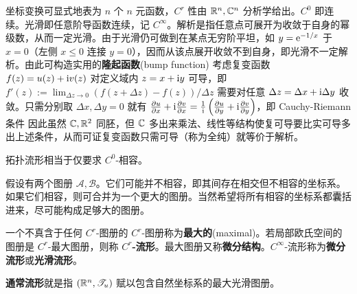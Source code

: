 \begin{remark}
    坐标变换可显式地表为 $n$ 个 $n$ 元函数，$C^r$ 性由 $\mathbb{R}^n,\mathbb{C}^n$ 分析学给出。$C^0$ 即连续。光滑即任意阶导函数连续，记 $C^\infty$。解析是指任意点可展开为收敛于自身的幂级数，从而一定光滑。由于光滑仍可做到在某点无穷阶平坦，如 $y=\mathrm{e}^{-1/x}$ 于 $x=0$（左侧 $x\leqslant 0$ 连接 $y=0$），因而从该点展开收敛不到自身，即光滑不一定解析。由此可构造实用的\textbf{隆起函数}(bump function)
    考虑复变函数 $f(z)=u(z)+\mathrm{i} v(z)$ 对定义域内 $z=x+\mathrm{i} y$ 可导，即 $f'(z):=\lim_{\Delta z\to 0}(f(z+\Delta z)-f(z))/\Delta z$ 需要对任意 $\Delta z=\Delta x+\mathrm{i}\Delta y$ 收敛。只需分别取 $\Delta x,\Delta y=0$ 就有 $\pdv{u}{x}+\mathrm{i}\pdv{v}{x}=\frac{1}{\mathrm{i}}\left(\pdv{u}{y}+\mathrm{i}\pdv{v}{y}\right)$，即 Cauchy-Riemann 条件
    因此虽然 $\mathbb{C},\mathbb{R}^2$ 同胚，但 $\mathbb{C}$ 多出来乘法、线性等结构使复可导要比实可导多出上述条件，从而可证复变函数只需可导（称为全纯）就等价于解析。
\end{remark}

\begin{example}
    拓扑流形相当于仅要求 $C^0$-相容。
\end{example}

假设有两个图册 $\mathcal A,\mathcal B$。它们可能并不相容，即其间存在相交但不相容的坐标系。如果它们相容，则可合并为一个更大的图册。当然希望将所有相容的坐标系都囊括进来，尽可能构成足够大的图册。

\begin{definition}
    一个不真含于任何 $C^r$-图册的 $C^r$-图册称为\textbf{最大的}(maximal)。若局部欧氏空间的图册是 $C^r$-最大图册，则称 \textbf{$C^r$-流形}。最大图册又称\textbf{微分结构}。$C^\infty$-流形称为\textbf{微分流形}或\textbf{光滑流形}。
\end{definition}

\begin{example}
    \textbf{通常流形}就是指 $(\mathbb{R}^n,\mathscr T_u)$ 赋以包含自然坐标系的最大光滑图册。
\end{example}

